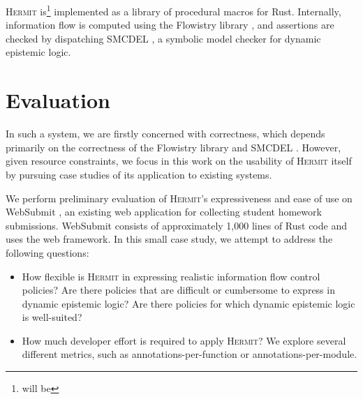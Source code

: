 \documentclass[letterpaper,twocolumn,10pt]{article}
\newcommand{\Hermit}{\textsc{Hermit}}
\begin{document}
\Hermit{} is\footnote{will be} implemented as a library of procedural macros for Rust. Internally,
information flow is computed using the Flowistry library \cite{crichton_2022a}, and assertions are
checked by dispatching SMCDEL \cite{gattinger_2018a}, a symbolic model checker for dynamic epistemic
logic.

\section{Evaluation}

In such a system, we are firstly concerned with correctness, which depends primarily on the
correctness of the Flowistry library \cite{crichton_2022a} and SMCDEL \cite{gattinger_2018a}.
However, given resource constraints, we focus in this work on the usability of \Hermit{} itself by
pursuing case studies of its application to existing systems.

We perform preliminary evaluation of \Hermit{}'s expressiveness and ease of use on WebSubmit
\cite{schwarzkopf_2022a}, an existing web application for collecting student homework submissions.
WebSubmit consists of approximately 1,000 lines of Rust code and uses the \cite{benitez_2024a} web
framework. In this small case study, we attempt to address the following questions:

\begin{itemize}
  \item How flexible is \Hermit{} in expressing realistic information flow control policies? Are
    there policies that are difficult or cumbersome to express in dynamic epistemic logic? Are there
    policies for which dynamic epistemic logic is well-suited?

  \item How much developer effort is required to apply \Hermit{}? We explore several different
    metrics, such as annotations-per-function or annotations-per-module.
\end{itemize}



\end{document}
